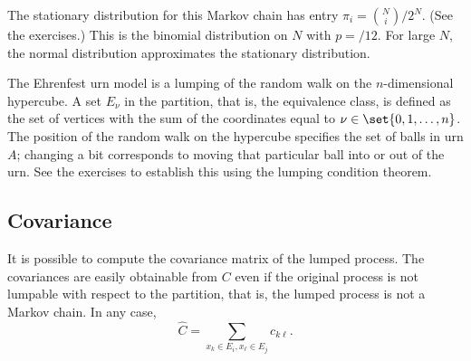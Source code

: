 \documentclass[12pt]{article}
\begin{document}
\begin{example}
    The stationary distribution for this Markov chain has entry \( \pi_i
    = \binom{N}{i}/2^N \).  (See the exercises.) This is the binomial
    distribution on \( N \) with \( p = /12 \).  For large \( N \), the normal
    distribution approximates the stationary distribution.

    The Ehrenfest urn model is a lumping of the random walk on the \( n \)-dimensional
    hypercube.  A set \( E_{\nu} \) in the partition, that is, the
    equivalence class, is defined as the set of vertices with the sum of
    the coordinates equal to \( \nu \in \set{0,1,\dots, n} \).  The
    position of the random walk on the hypercube specifies the set of
    balls in urn \( A \); changing a bit corresponds to moving that
    particular ball into or out of the urn. See the exercises to
    establish this using the lumping condition theorem.

\end{example}

\subsection*{Covariance}

It is possible to compute the covariance matrix of the lumped process.
The covariances are easily obtainable from \( C \) even if the original
process is not lumpable with respect to the partition, that is, the
lumped process is not a Markov chain.  In any case,
\[
    \hat{C} = \sum_{x_k \in E_i, x_{\ell} \in E_j } c_{k \ell}.
\]
\end{document}
